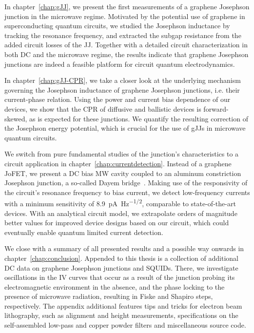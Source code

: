 In chapter~\ref{chap:gJJ}, we present the first measurements of a graphene Josephson junction in the microwave regime.
%
Motivated by the potential use of graphene in superconducting quantum circuits, we studied the Josephson inductance by tracking the resonance frequency, and extracted the subgap resistance from the added circuit losses of the JJ.
%
Together with a detailed circuit characterization in both DC and the microwave regime, the results indicate that graphene Josephson junctions are indeed a feasible platform for circuit quantum electrodynamics.


In chapter~\ref{chap:gJJ-CPR}, we take a closer look at the underlying mechanism governing the Josephson inductance of graphene Josephson junctions, i.e. their current-phase relation.
%
Using the power and current bias dependence of our devices, we show that the CPR of diffusive and ballistic devices is forward-skewed, as is expected for these junctions.
%
We quantify the resulting correction of the Josephson energy potential, which is crucial for the use of gJJs in microwave quantum circuits.

We switch from pure fundamental studies of the junction's characteristics to a circuit application in chapter~\ref{chap:currentdetection}.
%
Instead of a graphene JoFET, we present a DC bias MW cavity coupled to an aluminum constriction Josephson junction, a so-called Dayem bridge~\cite{andersonRadioFrequencyEffectsSuperconducting1964}.
%
Making use of the responsivity of the circuit's resonance frequency to bias current, we detect low-frequency currents with a minimum sensitivity of \SI{8.9}{\pico\ampere\per\hertz\tothe{1/2}}, comparable to state-of-the-art devices.
%
With an analytical circuit model, we extrapolate orders of magnitude better values for improved device designs based on our circuit, which could eventually enable quantum limited current detection.


We close with a summary of all presented results and a possible way onwards in chapter~\ref{chap:conclusion}.
%
Appended to this thesis is a collection of additional DC data on graphene Josephson junctions and SQUIDs.
%
There, we investigate oscillations in the IV curves that occur as a result of the junction probing its electromagnetic environment in the absence, and the phase locking to the presence of microwave radiation, resulting in Fiske and Shapiro steps, respectively.
%
The appendix additional features tips and tricks for electron beam lithography, such as alignment and height measurements, specifications on the self-assembled low-pass and copper powder filters and miscellaneous source code.




